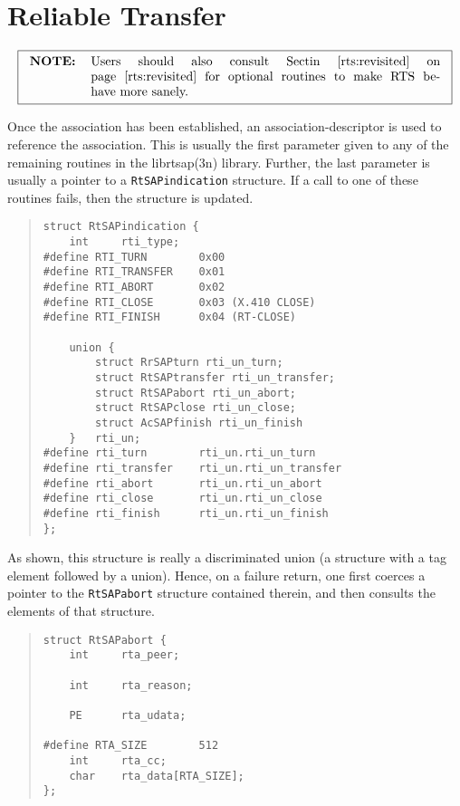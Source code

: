 \section	{Reliable Transfer}\label{rts:transfer}

\[\fbox{\begin{tabular}{lp{0.8\textwidth}}
\bf NOTE:&	Users should also consult Sectin~\ref{rts:revisited} on
		page~\pageref{rts:revisited} for optional routines to
		make RTS behave more sanely.
\end{tabular}}\]

Once the association has been established,
an association-descriptor is used to reference the association.
This is usually the first parameter given to any of the remaining routines in
the \man librtsap(3n) library.
Further,
the last parameter is usually a pointer to a \verb"RtSAPindication"
structure.
If a call to one of these routines fails,
then the structure is updated.
\begin{quote}\small\begin{verbatim}
struct RtSAPindication {
    int     rti_type;
#define RTI_TURN        0x00
#define RTI_TRANSFER    0x01
#define RTI_ABORT       0x02
#define RTI_CLOSE       0x03 (X.410 CLOSE)
#define RTI_FINISH      0x04 (RT-CLOSE)

    union {
        struct RrSAPturn rti_un_turn;
        struct RtSAPtransfer rti_un_transfer;
        struct RtSAPabort rti_un_abort;
        struct RtSAPclose rti_un_close;
        struct AcSAPfinish rti_un_finish
    }   rti_un;
#define rti_turn        rti_un.rti_un_turn
#define rti_transfer    rti_un.rti_un_transfer
#define rti_abort       rti_un.rti_un_abort
#define rti_close       rti_un.rti_un_close
#define rti_finish      rti_un.rti_un_finish
};
\end{verbatim}\end{quote}
As shown, this structure is really a discriminated union
(a structure with a tag element followed by a union).
Hence, on a failure return,
one first coerces a pointer to the \verb"RtSAPabort" structure contained
therein,
and then consults the elements of that structure.
\begin{quote}\small\begin{verbatim}
struct RtSAPabort {
    int     rta_peer;

    int     rta_reason;

    PE      rta_udata;

#define RTA_SIZE        512
    int     rta_cc;
    char    rta_data[RTA_SIZE];
};
\end{verbatim}\end{quote}
